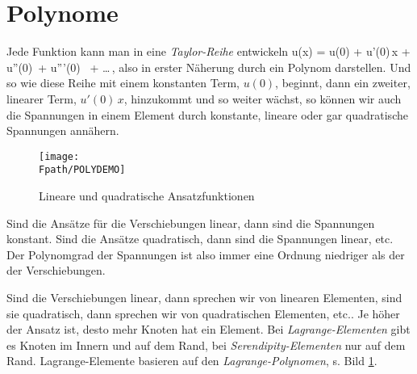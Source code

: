 

\section{Polynome}\label{Polynome}
Jede Funktion kann man in eine {\em Taylor-Reihe\/} entwickeln
\bfoo
u(x) = u(0) + u'(0)\,x + u''(0)\, + u'''(0) \, + \ldots\,,
\efoo
also in erster N\"{a}herung durch ein Polynom darstellen. Und so wie diese Reihe mit einem
konstanten Term, $u(0)$, beginnt, dann ein zweiter, linearer Term, $u'(0)\,x$, hinzukommt
und so weiter w\"{a}chst, so k\"{o}nnen wir auch die Spannungen in einem Element durch konstante,
lineare oder gar quadratische Spannungen ann\"{a}hern.
\begin{figure}[tbp]
\if {} \sidecaption \fi
\texttt{[image: \\Fpath/POLYDEMO]}
\caption{Lineare und quadratische Ansatzfunktionen} \label{PolyDemo}
\end{figure}%

Sind die Ans\"{a}tze f\"{u}r die Verschiebungen linear, dann sind die Spannungen konstant. Sind
die Ans\"{a}tze quadratisch, dann sind die Spannungen linear, etc. Der Polynomgrad der
Spannungen ist also immer eine Ordnung niedriger als der der Verschiebungen.

Sind die Verschiebungen linear, dann sprechen wir von linearen Elementen, sind sie quadratisch, dann sprechen wir von quadratischen
Elementen, etc.. Je h\"{o}her der Ansatz ist, desto mehr Knoten
hat ein Element. Bei {\em Lagrange-Elementen\/} gibt es Knoten
im Innern und auf dem Rand, bei {\em Serendipity-Elementen\/}
nur auf dem Rand. Lagrange-Elemente basieren auf den {\em
Lagrange-Polynomen\/}, s. Bild \ref{PolyDemo}.

